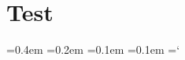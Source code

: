\documentclass{article}
\begin{document}
\section{Test}
\blindtext
\bigskip
\begin{center}
\begin{minipage}{0.7\textwidth}
\ttfamily
{}\font=0.4em
\font=0.2em
\font=0.1em
\font=0.1em
\hyphenchar\font=`\-
\blindtext
\end{minipage}
\end{center}
\bigskip
\blindtext
\end{document}

